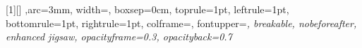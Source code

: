 \newlength{\MyBoxWidth}
\ifx\MayFloat\undefined
	\ifx\DisableWideScreen\undefined
		\setlength{\MyBoxWidth}{.75\textwidth}
	\else
		\setlength{\MyBoxWidth}{.65\textwidth}
	\fi
\else    
    \ifx\eBook\undefined
		\setlength{\MyBoxWidth}{.8\textwidth}
    \else
		\setlength{\MyBoxWidth}{.62\textwidth}
	\fi
\fi

[1][]{
    ,arc=3mm,
width=\MyBoxWidth,%
    boxsep=0cm,
    toprule=1pt,
    leftrule=1pt,
    bottomrule=1pt,
    rightrule=1pt,
    colframe=\TitlePageColor,
    fontupper=\raggedleft\fontsize{16pt}{14pt}\itshape,
    breakable,
    nobeforeafter,
    enhanced jigsaw,
    opacityframe=0.3,
    opacityback=0.7
}
\makeatother







